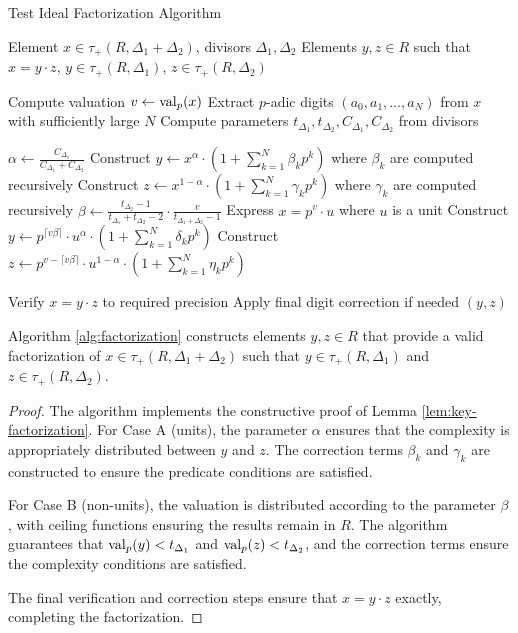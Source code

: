 \begin{algorithm}[H]
\caption{Test Ideal Factorization Algorithm}
\label{alg:factorization}
\begin{algorithmic}[1]
\Require Element $x \in \tau_+(R,\Delta_1+\Delta_2)$, divisors $\Delta_1, \Delta_2$
\Ensure Elements $y, z \in R$ such that $x = y \cdot z$, $y \in \tau_+(R,\Delta_1)$, $z \in \tau_+(R,\Delta_2)$

\State Compute valuation $v \gets \operatorname{val}_p(x)$
\State Extract $p$-adic digits $(a_0, a_1, \ldots, a_N)$ from $x$ with sufficiently large $N$
\State Compute parameters $t_{\Delta_1}, t_{\Delta_2}, C_{\Delta_1}, C_{\Delta_2}$ from divisors

 
    \State $\alpha \gets \frac{C_{\Delta_1}}{C_{\Delta_1} + C_{\Delta_2}}$
    \State Construct $y \gets x^{\alpha} \cdot \left(1 + \sum_{k=1}^{N} \beta_k p^k\right)$ where $\beta_k$ are computed recursively
    \State Construct $z \gets x^{1-\alpha} \cdot \left(1 + \sum_{k=1}^{N} \gamma_k p^k\right)$ where $\gamma_k$ are computed recursively
\Else {}
    \State $\beta \gets \frac{t_{\Delta_2}-1}{t_{\Delta_1}+t_{\Delta_2}-2} \cdot \frac{v}{t_{\Delta_1+\Delta_2}-1}$
    \State Express $x = p^v \cdot u$ where $u$ is a unit
    \State Construct $y \gets p^{\lceil v\beta \rceil} \cdot u^{\alpha} \cdot \left(1 + \sum_{k=1}^{N} \delta_k p^k\right)$
    \State Construct $z \gets p^{v-\lceil v\beta \rceil} \cdot u^{1-\alpha} \cdot \left(1 + \sum_{k=1}^{N} \eta_k p^k\right)$
\EndIf

\State Verify $x = y \cdot z$ to required precision
\State Apply final digit correction if needed
\State \Return $(y, z)$
\end{algorithmic}
\end{algorithm}

\begin{theorem}
Algorithm \ref{alg:factorization} constructs elements $y, z \in R$ that provide a valid factorization of $x \in \tau_+(R,\Delta_1+\Delta_2)$ such that $y \in \tau_+(R,\Delta_1)$ and $z \in \tau_+(R,\Delta_2)$.
\end{theorem}

\begin{proof}
The algorithm implements the constructive proof of Lemma \ref{lem:key-factorization}. For Case A (units), the parameter $\alpha$ ensures that the complexity is appropriately distributed between $y$ and $z$. The correction terms $\beta_k$ and $\gamma_k$ are constructed to ensure the predicate conditions are satisfied.

For Case B (non-units), the valuation is distributed according to the parameter $\beta$, with ceiling functions ensuring the results remain in $R$. The algorithm guarantees that $\operatorname{val}_p(y) < t_{\Delta_1}$ and $\operatorname{val}_p(z) < t_{\Delta_2}$, and the correction terms ensure the complexity conditions are satisfied.

The final verification and correction steps ensure that $x = y \cdot z$ exactly, completing the factorization.
\end{proof}

